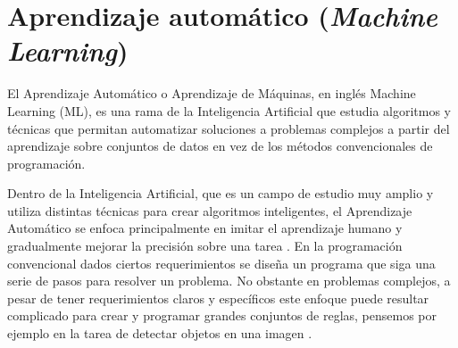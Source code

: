 

\section{Aprendizaje automático (\textit{Machine Learning})}
\label{sec:ML}

El Aprendizaje Automático o Aprendizaje de Máquinas, en inglés Machine Learning (ML), es una rama de la Inteligencia Artificial que estudia algoritmos y técnicas que permitan automatizar soluciones a problemas complejos a partir del aprendizaje sobre conjuntos de datos en vez de los métodos convencionales de programación. 

Dentro de la Inteligencia Artificial, que es un campo de estudio muy amplio y utiliza distintas técnicas para crear algoritmos inteligentes, el Aprendizaje Automático se enfoca principalmente en imitar el aprendizaje humano y gradualmente mejorar la precisión sobre una tarea \cite{ibm_what_nodate}. En la programación convencional dados ciertos requerimientos se diseña un programa que siga una serie de pasos para resolver un problema. No obstante en problemas complejos, a pesar de tener requerimientos claros y específicos este enfoque puede resultar complicado para crear y programar grandes conjuntos de reglas, pensemos por ejemplo en la tarea de detectar objetos en una imagen \cite{rebala_introduction_2019}.

